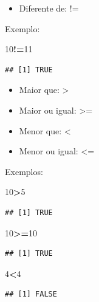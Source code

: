 \documentclass[
]{book}
\newenvironment{Shaded}{\begin{snugshade}}{\end{snugshade}}
\newcommand{\DecValTok}[1]{\textcolor[rgb]{0.00,0.00,0.81}{#1}}
\newcommand{\OperatorTok}[1]{\textcolor[rgb]{0.81,0.36,0.00}{\textbf{#1}}}
\providecommand{\tightlist}{%
  \setlength{\itemsep}{0pt}\setlength{\parskip}{0pt}}
\begin{document}
\begin{itemize}
\tightlist
\item
  Diferente de: !=
\end{itemize}

Exemplo:

\begin{Shaded}
\begin{Highlighting}[]
\DecValTok{10}\OperatorTok{!=}\DecValTok{11}
\end{Highlighting}
\end{Shaded}

\begin{verbatim}
## [1] TRUE
\end{verbatim}

\begin{itemize}
\item
  Maior que: \textgreater{}
\item
  Maior ou igual: \textgreater=
\item
  Menor que: \textless{}
\item
  Menor ou igual: \textless=
\end{itemize}

Exemplos:

\begin{Shaded}
\begin{Highlighting}[]
\DecValTok{10}\OperatorTok{>}\DecValTok{5}
\end{Highlighting}
\end{Shaded}

\begin{verbatim}
## [1] TRUE
\end{verbatim}

\begin{Shaded}
\begin{Highlighting}[]
\DecValTok{10}\OperatorTok{>=}\DecValTok{10}
\end{Highlighting}
\end{Shaded}

\begin{verbatim}
## [1] TRUE
\end{verbatim}

\begin{Shaded}
\begin{Highlighting}[]
\DecValTok{4}\OperatorTok{<}\DecValTok{4}
\end{Highlighting}
\end{Shaded}

\begin{verbatim}
## [1] FALSE
\end{verbatim}
\end{document}
